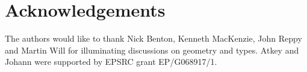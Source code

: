 \documentclass{sigplanconf}
\theoremstyle{examplestyle}
\theoremstyle{restatementstyle}
\begin{document}






%




\section*{Acknowledgements}
The authors would like to thank Nick Benton, Kenneth MacKenzie, John
Reppy and Martin Will for illuminating discussions on geometry and
types. Atkey and Johann were supported by EPSRC grant EP/G068917/1.
\end{document}
